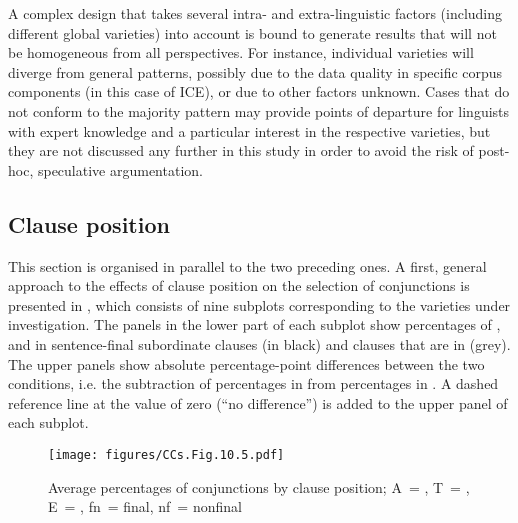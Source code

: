 A complex design that takes several intra- and extra-linguistic factors (including different global varieties) into account is bound to generate results that will not be homogeneous from all perspectives. For instance, individual varieties will diverge from general patterns, possibly due to the data quality in specific corpus components (in this case of ICE), or due to other factors unknown. Cases that do not conform to the majority pattern may provide points of departure for linguists with expert knowledge and a particular interest in the respective varieties, but they are not discussed any further in this study in order to avoid the risk of post-hoc, speculative argumentation.

\subsection{\label{bkm:Ref59530974}\label{bkm:Ref60239588}\label{bkm:Ref60241323}\label{bkm:Ref60417335}Clause position}\label{sec:10.2.3}

This section is organised in parallel to the two preceding ones. A first, general approach to the effects of clause position on the selection of conjunctions is presented in , which consists of nine subplots corresponding to the varieties under investigation. The panels in the lower part of each subplot show percentages of ,  and  in sentence-final subordinate clauses (in black) and clauses that are in  (grey). The upper panels show absolute percentage-point differences between the two conditions, i.e. the subtraction of percentages in  from percentages in . A dashed reference line at the value of zero (“no difference”) is added to the upper panel of each subplot.

\begin{figure}
\texttt{[image: figures/CCs.Fig.10.5.pdf]}
\caption{\label{bkm:Ref60159375}\label{fig:10.5}Average percentages of conjunctions by clause position; A~= , T~= , E~= , fn~= final, nf~= nonfinal}
\end{figure}

